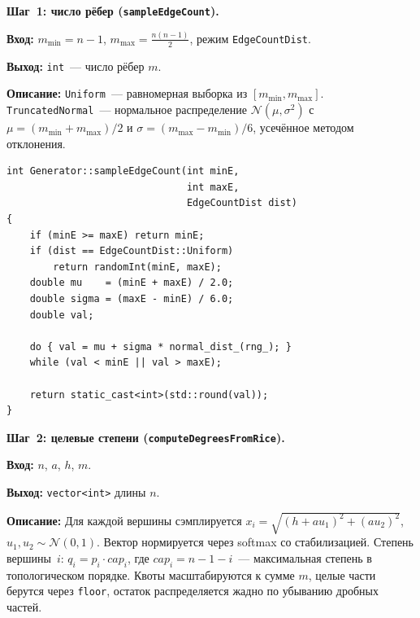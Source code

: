 \textbf{Шаг~1: число рёбер (\texttt{sampleEdgeCount}).}

\textbf{Вход:} $m_{\min} = n-1$, $m_{\max} = \frac{n(n-1)}{2}$,
режим \texttt{EdgeCountDist}.

\textbf{Выход:} \texttt{int}~--- число рёбер $m$.

\textbf{Описание:} \texttt{Uniform}~--- равномерная выборка из
$[m_{\min}, m_{\max}]$. \texttt{TruncatedNormal}~--- нормальное
распределение $\mathcal{N}(\mu, \sigma^2)$ с $\mu = (m_{\min} + m_{\max})/2$
и $\sigma = (m_{\max} - m_{\min})/6$, усечённое методом отклонения.

\begin{lstlisting}[style=cppstyle, caption={Выбор числа рёбер (Generator.cc)}]
int Generator::sampleEdgeCount(int minE,
                               int maxE,
                               EdgeCountDist dist)
{
    if (minE >= maxE) return minE;
    if (dist == EdgeCountDist::Uniform)
        return randomInt(minE, maxE);
    double mu    = (minE + maxE) / 2.0;
    double sigma = (maxE - minE) / 6.0;
    double val;

    do { val = mu + sigma * normal_dist_(rng_); }
    while (val < minE || val > maxE);

    return static_cast<int>(std::round(val));
}
\end{lstlisting}

\textbf{Шаг~2: целевые степени (\texttt{computeDegreesFromRice}).}

\textbf{Вход:} $n$, $a$, $h$, $m$.

\textbf{Выход:} \texttt{vector<int>} длины $n$.

\textbf{Описание:} Для каждой вершины сэмплируется
$x_i = \sqrt{(h + au_1)^2 + (au_2)^2}$, $u_1, u_2 \sim \mathcal{N}(0,1)$.
Вектор нормируется через softmax со стабилизацией. Степень вершины~$i$:
$q_i = p_i \cdot \mathit{cap}_i$, где $\mathit{cap}_i = n - 1 - i$~---
максимальная степень в топологическом порядке. Квоты масштабируются к
сумме $m$, целые части берутся через \texttt{floor}, остаток
распределяется жадно по убыванию дробных частей.

